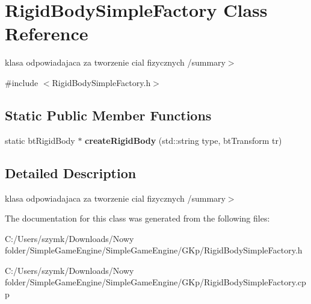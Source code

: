 \hypertarget{class_rigid_body_simple_factory}{}\section{Rigid\+Body\+Simple\+Factory Class Reference}
\label{class_rigid_body_simple_factory}


klasa odpowiadajaca za tworzenie cial fizycznych /summary$>$  




{\ttfamily \#include $<$Rigid\+Body\+Simple\+Factory.\+h$>$}

\subsection*{Static Public Member Functions}
\begin{DoxyCompactItemize}
\item 
\mbox{\label{class_rigid_body_simple_factory_a69c29aeb05d934766c3ae082c48efe2f}} 
static bt\+Rigid\+Body $\ast$ {\bfseries create\+Rigid\+Body} (std\+::string type, bt\+Transform tr)
\end{DoxyCompactItemize}


\subsection{Detailed Description}
klasa odpowiadajaca za tworzenie cial fizycznych /summary$>$ 

The documentation for this class was generated from the following files\+:\begin{DoxyCompactItemize}
\item 
C\+:/\+Users/szymk/\+Downloads/\+Nowy folder/\+Simple\+Game\+Engine/\+Simple\+Game\+Engine/\+G\+Kp/Rigid\+Body\+Simple\+Factory.\+h\item 
C\+:/\+Users/szymk/\+Downloads/\+Nowy folder/\+Simple\+Game\+Engine/\+Simple\+Game\+Engine/\+G\+Kp/Rigid\+Body\+Simple\+Factory.\+cpp\end{DoxyCompactItemize}
